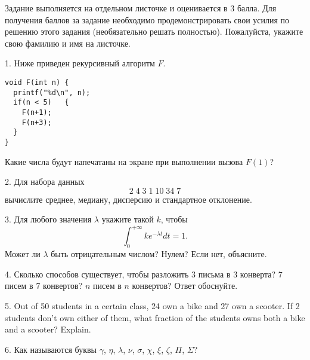 \documentclass{article}
\begin{document}
Задание выполняется на отдельном листочке и оценивается в 3 балла.
Для получения баллов за задание необходимо продемонстрировать
свои усилия по решению этого задания (необязательно решать полностью).
Пожалуйста, укажите свою фамилию и имя на листочке.

\medskip

1. Ниже приведен рекурсивный алгоритм $F$. 
\begin{verbatim}
void F(int n) {
  printf("%d\n", n);
  if(n < 5)   {
    F(n+1);
    F(n+3);
  }
}
\end{verbatim}
Какие числа будут напечатаны на экране при выполнении вызова $F(1)$?

\medskip

2. Для набора данных
$$ 2 \; 4\; 3 \; 1 \; 10 \; 34 \; 7 $$
вычислите среднее, медиану, дисперсию и стандартное отклонение.

\medskip

3. Для любого значения $\lambda$ укажите такой $k$, чтобы
$$ \int_0^{+\infty} k e^{-\lambda t} dt = 1.$$
Может ли $\lambda$ быть отрицательным числом? Нулем? Если нет, объясните.

\medskip

4. Сколько способов существует, чтобы разложить 3 письма в 3 конверта? 7 писем в 7 конвертов?
$n$ писем в $n$ конвертов? Ответ обоснуйте.

\medskip

5. Out of 50 students in a certain class, 24 own a bike and 27 own a scooter. If 2 students don't own either of them, what fraction of the students owns both a bike and a scooter? Explain.

\medskip

6. Как называются буквы $\gamma$, $\eta$, $\lambda$, $\nu$, $\sigma$, $\chi$, $\xi$, $\zeta$, $\Pi$, $\Sigma$?
\end{document}
